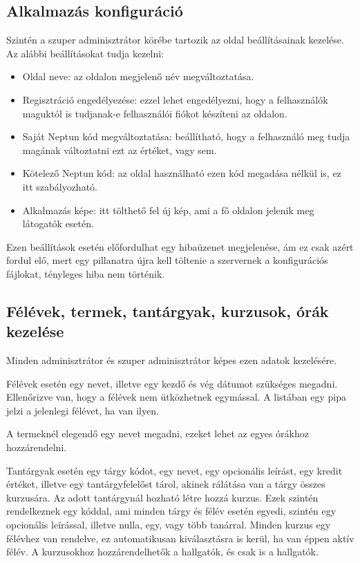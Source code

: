 \documentclass[
]{thesis-ekf}
\theoremstyle{definition}
\theoremstyle{remark}
\begin{document}
\subsection{Alkalmazás konfiguráció}

Szintén a szuper adminisztrátor körébe tartozik az oldal beállításainak kezelése. Az alábbi beállításokat tudja kezelni:
\begin{itemize}
	\item Oldal neve: az oldalon megjelenő név megváltoztatása.
	\item Regisztráció engedélyezése: ezzel lehet engedélyezni, hogy a felhasználók maguktól is tudjanak-e felhasználói fiókot készíteni az oldalon.
	\item Saját Neptun\cite{Neptun} kód megváltoztatása: beállítható, hogy a felhasználó meg tudja magának változtatni ezt az értéket, vagy sem.
	\item Kötelező Neptun kód: az oldal használható ezen kód megadása nélkül is, ez itt szabályozható.
	\item Alkalmazás képe: itt tölthető fel új kép, ami a fő oldalon jelenik meg látogatók esetén.
\end{itemize}

Ezen beállítások esetén előfordulhat egy hibaüzenet megjelenése, ám ez csak azért fordul elő, mert egy pillanatra újra kell töltenie a szervernek a konfigurációs fájlokat, tényleges hiba nem történik.

\subsection{Félévek, termek, tantárgyak, kurzusok, órák kezelése}

Minden adminisztrátor és szuper adminisztrátor képes ezen adatok kezelésére.

Félévek esetén egy nevet, illetve egy kezdő és vég dátumot szükséges megadni. Ellenőrizve van, hogy a félévek nem ütközhetnek egymással. A listában egy pipa jelzi a jelenlegi félévet, ha van ilyen.

A termeknél elegendő egy nevet megadni, ezeket lehet az egyes órákhoz hozzárendelni.

Tantárgyak esetén egy tárgy kódot, egy nevet, egy opcionális leírást, egy kredit értéket, illetve egy tantárgyfelelőst tárol, akinek rálátása van a tárgy összes kurzusára. Az adott tantárgynál hozható létre hozzá kurzus. Ezek szintén rendelkeznek egy kóddal, ami minden tárgy és félév esetén egyedi, szintén egy opcionális leírással, illetve nulla, egy, vagy több tanárral. Minden kurzus egy félévhez van rendelve, ez automatikusan kiválasztásra is kerül, ha van éppen aktív félév. A kurzusokhoz hozzárendelhetők a hallgatók, és csak is a hallgatók.
\end{document}

